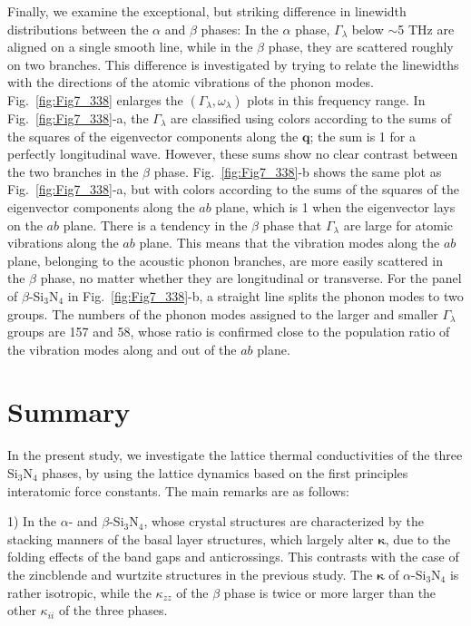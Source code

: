\documentclass[twocolumn,amsmath,amssymb,a4paper,prb,superscriptaddress,floatfix]{revtex4-1}
\begin{document}
Finally, we examine the exceptional, but striking difference in linewidth
distributions between the $\alpha$ and $\beta$ phases: In the $\alpha$ phase,
$\Gamma_\lambda$ below $\sim$5 THz are aligned on a single smooth line, while in
the $\beta$ phase, they are scattered roughly on two branches.  This difference
is investigated by trying to relate the linewidths with the directions of the
atomic vibrations of the phonon modes.  Fig.~\ref{fig:Fig7_338} enlarges the
$(\Gamma_\lambda,\omega_\lambda)$ plots in this frequency range. In
Fig.~\ref{fig:Fig7_338}-a, the $\Gamma_\lambda$ are classified using colors
according to the sums of the squares of the eigenvector components along the
$\mathbf{q}$; the sum is 1 for a perfectly longitudinal wave. However, these
sums show no clear contrast between the two branches in the $\beta$ phase.
Fig.~\ref{fig:Fig7_338}-b shows the same plot as Fig.~\ref{fig:Fig7_338}-a, but
with colors according to the sums of the squares of the eigenvector components
along the $ab$ plane, which is 1 when the eigenvector lays on the $ab$ plane.
There is a tendency in the $\beta$ phase that  $\Gamma_\lambda$ are large for
atomic vibrations along the $ab$ plane.  This means that the vibration modes
along the $ab$ plane, belonging to the acoustic phonon branches, are more easily
scattered in the $\beta$ phase, no matter whether they are longitudinal or
transverse. For the panel of $\beta$-Si$_3$N$_4$ in Fig.~\ref{fig:Fig7_338}-b, a
straight line splits the phonon modes to two groups. The numbers of the phonon
modes assigned to the larger and smaller $\Gamma_\lambda$ groups are 157 and 58,
whose ratio is confirmed close to the population ratio of the vibration modes
along and out of the $ab$ plane.


\section{Summary}

In the present study, we investigate the lattice thermal conductivities of the
three Si$_3$N$_4$ phases, by using the lattice dynamics based on the first
principles interatomic force constants. The main remarks are as follows:

1) In the $\alpha$- and $\beta$-Si$_3$N$_4$, whose crystal structures are
characterized by the stacking manners of the basal layer structures, which
largely alter $\boldsymbol{\kappa}$, due to the folding effects of the band gaps
and anticrossings. This contrasts with the case of
the zincblende and wurtzite structures in the previous study\cite{phono3py}.
The $\boldsymbol{\kappa}$ of $\alpha$-Si$_3$N$_4$ is rather isotropic, while the
$\kappa$$_{zz}$ of the $\beta$ phase is twice or more larger than the other
$\kappa_{ii}$ of the three phases.
\end{document}
